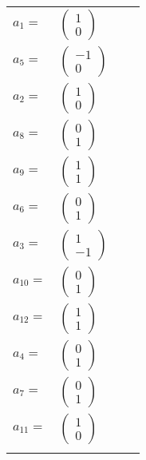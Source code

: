 \documentclass[1p]{elsarticle_modified}
\theoremstyle{definition}
\begin{document}
\begin{tabular}{m{7pt} m{180pt} m{7pt} m{180pt} }
\flushright $a_{1}=$&$\begin{pmatrix}1\\0\end{pmatrix}$ \\
\flushright $a_{5}=$&$\begin{pmatrix}-1\\0\end{pmatrix}$ \\
\flushright $a_{2}=$&$\begin{pmatrix}1\\0\end{pmatrix}$ \\
\flushright $a_{8}=$&$\begin{pmatrix}0\\1\end{pmatrix}$ \\
\flushright $a_{9}=$&$\begin{pmatrix}1\\1\end{pmatrix}$ \\
\flushright $a_{6}=$&$\begin{pmatrix}0\\1\end{pmatrix}$ \\
\flushright $a_{3}=$&$\begin{pmatrix}1\\-1\end{pmatrix}$ \\
\flushright $a_{10}=$&$\begin{pmatrix}0\\1\end{pmatrix}$ \\
\flushright $a_{12}=$&$\begin{pmatrix}1\\1\end{pmatrix}$ \\
\flushright $a_{4}=$&$\begin{pmatrix}0\\1\end{pmatrix}$ \\
\flushright $a_{7}=$&$\begin{pmatrix}0\\1\end{pmatrix}$ \\
\flushright $a_{11}=$&$\begin{pmatrix}1\\0\end{pmatrix}$\\&\end{tabular}
\end{document}
